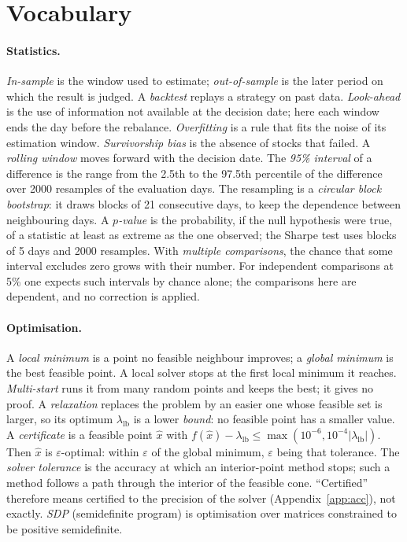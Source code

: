 \documentclass[11pt,a4paper]{article}
\newcommand{\lb}{\lambda_{\mathrm{lb}}}
\begin{document}
\section{Vocabulary}\label{app:voc}
\paragraph{Statistics.}
\emph{In-sample} is the window used to estimate; \emph{out-of-sample} is the later period on which the result is judged.
A \emph{backtest} replays a strategy on past data.
\emph{Look-ahead} is the use of information not available at the decision date; here each window ends the day before the rebalance.
\emph{Overfitting} is a rule that fits the noise of its estimation window.
\emph{Survivorship bias} is the absence of stocks that failed.
A \emph{rolling window} moves forward with the decision date.
The \emph{95\% interval} of a difference is the range from the 2.5th to the 97.5th percentile of the difference over 2000 resamples of the evaluation days.
The resampling is a \emph{circular block bootstrap}: it draws blocks of 21 consecutive days, to keep the dependence between neighbouring days.
A \emph{$p$-value} is the probability, if the null hypothesis were true, of a statistic at least as extreme as the one observed; the Sharpe test uses blocks of 5 days and 2000 resamples.
With \emph{multiple comparisons}, the chance that some interval excludes zero grows with their number.
For \cTests{} independent comparisons at 5\% one expects \cExpectedChance{} such intervals by chance alone; the comparisons here are dependent, and no correction is applied.
\paragraph{Optimisation.}
A \emph{local minimum} is a point no feasible neighbour improves; a \emph{global minimum} is the best feasible point.
A local solver stops at the first local minimum it reaches.
\emph{Multi-start} runs it from many random points and keeps the best; it gives no proof.
A \emph{relaxation} replaces the problem by an easier one whose feasible set is larger, so its optimum $\lb$ is a lower \emph{bound}: no feasible point has a smaller value.
A \emph{certificate} is a feasible point $\hat x$ with $f(\hat x)-\lb\le\max(10^{-6},10^{-4}|\lb|)$.
Then $\hat x$ is $\varepsilon$-optimal: within $\varepsilon$ of the global minimum, $\varepsilon$ being that tolerance.
The \emph{solver tolerance} is the accuracy at which an interior-point method stops; such a method follows a path through the interior of the feasible cone.
``Certified'' therefore means certified to the precision of the solver (Appendix~\ref{app:acc}), not exactly.
\emph{SDP} (semidefinite program) is optimisation over matrices constrained to be positive semidefinite.
\end{document}
